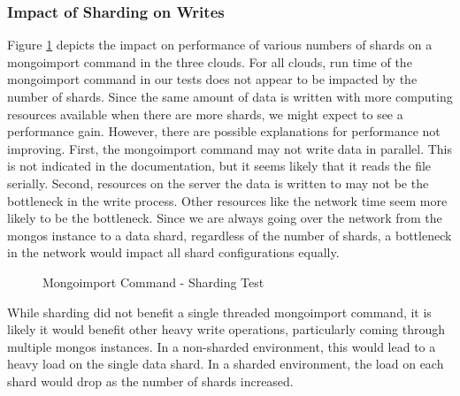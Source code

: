 \documentclass[9pt,twocolumn,twoside]{../../styles/osajnl}
\begin{document}
\subsubsection{Impact of Sharding on Writes}




Figure \ref{fig:shard-import} depicts the impact on performance of various numbers of shards on a mongoimport command in the three clouds.  For all clouds, run time of the mongoimport command in our tests does not appear to be impacted by the number of shards.  Since the same amount of data is written with more computing resources available when there are more shards, we might expect to see a performance gain.  However, there are possible explanations for performance not improving.  First, the mongoimport command may not write data in parallel.  This is not indicated in the documentation, but it seems likely that it reads the file serially.  Second, resources on the server the data is written to may not be the bottleneck in the write process.  Other resources like the network time seem more likely to be the bottleneck.  Since we are always going over the network from the mongos instance to a data shard, regardless of the number of shards, a bottleneck in the network would impact all shard configurations equally.

\begin{figure}[htbp]
\centering
{}
\caption{Mongoimport Command - Sharding Test}
\label{fig:shard-import}
\end{figure}

While sharding did not benefit a single threaded mongoimport command, it is likely it would benefit other heavy write operations, particularly coming through multiple mongos instances.  In a non-sharded environment, this would lead to a heavy load on the single data shard.  In a sharded environment, the load on each shard would drop as the number of shards increased.
\end{document}
